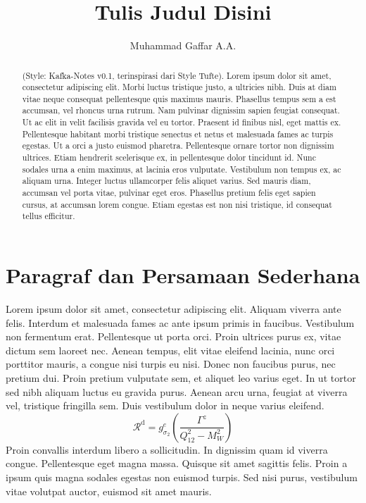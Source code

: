 \documentclass{article}
\title{Tulis Judul Disini}
\author{Muhammad Gaffar A.A.}
\begin{document}
\begin{titlepage}
\thispagestyle{empty}
\maketitle

\begin{abstract}
(Style: Kafka-Notes v0.1, terinspirasi dari Style Tufte). Lorem ipsum dolor sit amet, consectetur adipiscing elit. Morbi luctus tristique justo, a ultricies nibh. Duis at diam vitae neque consequat pellentesque quis maximus mauris. Phasellus tempus sem a est accumsan, vel rhoncus urna rutrum. Nam pulvinar dignissim sapien feugiat consequat. Ut ac elit in velit facilisis gravida vel eu tortor. Praesent id finibus nisl, eget mattis ex. Pellentesque habitant morbi tristique senectus et netus et malesuada fames ac turpis egestas. Ut a orci a justo euismod pharetra. Pellentesque ornare tortor non dignissim ultrices. Etiam hendrerit scelerisque ex, in pellentesque dolor tincidunt id. Nunc sodales urna a enim maximus, at lacinia eros vulputate. Vestibulum non tempus ex, ac aliquam urna. Integer luctus ullamcorper felis aliquet varius. Sed mauris diam, accumsan vel porta vitae, pulvinar eget eros. Phasellus pretium felis eget sapien cursus, at accumsan lorem congue. Etiam egestas est non nisi tristique, id consequat tellus efficitur. 
\end{abstract}

\tableofcontents
\end{titlepage}



\section{Paragraf dan Persamaan Sederhana}
Lorem ipsum dolor sit amet, consectetur adipiscing elit. Aliquam viverra ante felis. Interdum et malesuada fames ac ante ipsum primis in faucibus. Vestibulum non fermentum erat. Pellentesque ut porta orci. Proin ultrices purus ex, vitae dictum sem laoreet nec. Aenean tempus, elit vitae eleifend lacinia, nunc orci porttitor mauris, a congue nisi turpis eu nisi. Donec non faucibus purus, nec pretium dui. Proin pretium vulputate sem, et aliquet leo varius eget. In ut tortor sed nibh aliquam luctus eu gravida purus. Aenean arcu urna, feugiat at viverra vel, tristique fringilla sem. Duis vestibulum dolor in neque varius eleifend. 
\begin{equation}
\mathcal{R}^{\text{d}} = g^e_{\sigma_{2}}\left(\frac{\Gamma^z}{Q_{12}^2-M_W^2}\right)
\end{equation}
Proin convallis interdum libero a sollicitudin. In dignissim quam id viverra congue. Pellentesque eget magna massa. Quisque sit amet sagittis felis. Proin a ipsum quis magna sodales egestas non euismod turpis. Sed nisi purus, vestibulum vitae volutpat auctor, euismod sit amet mauris. 
\end{document}
